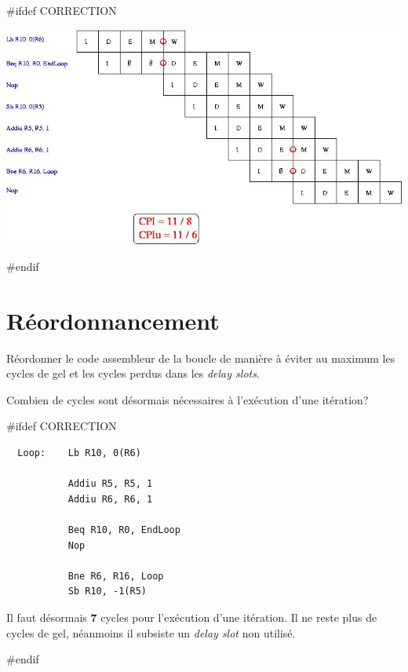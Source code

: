 #ifdef CORRECTION
\begin{correction}

  \begin{center}
    \includegraphics[scale=0.7]{figures/correction-analyse-simplifiee.jpg}
  \end{center}

\end{correction}
#endif

%
%

\section{R\'eordonnancement}

R\'eordonner le code assembleur de la boucle de mani\`ere \`a \'eviter
au maximum les cycles de gel et les cycles perdus dans les \textit{delay slots}.

Combien de cycles sont d\'esormais n\'ecessaires \`a l'ex\'ecution d'une
it\'eration?

#ifdef CORRECTION
\begin{correction}

  \begin{verbatim}
  Loop:    Lb R10, 0(R6)

           Addiu R5, R5, 1
           Addiu R6, R6, 1

           Beq R10, R0, EndLoop
           Nop

           Bne R6, R16, Loop
           Sb R10, -1(R5)
  \end{verbatim}

  Il faut d\'esormais \textbf{7} cycles pour l'ex\'ecution d'une it\'eration.
  Il ne reste plus de cycles de gel, n\'eanmoins il subsiste un
  \textit{delay slot} non utilis\'e.

\end{correction}
#endif

